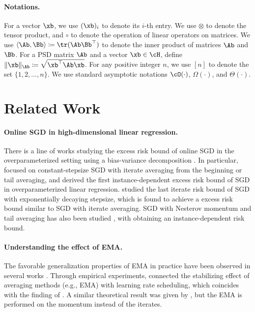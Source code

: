 \documentclass[11pt]{article}
\begin{document}
\paragraph{Notations.}
For a vector $\xb$, we use $(\xb)_i$ to denote its $i$-th entry.
We use $\otimes$ to denote the tensor product, and $\circ$ to denote the operation of linear operators on matrices.
We use $\langle\Ab, \Bb\rangle\coloneqq\tr(\Ab\Bb^\top)$ to denote the inner product of matrices $\Ab$ and $\Bb$.
For a PSD matrix $\Ab$ and a vector $\xb\in\cH$, define $\|\xb\|_{\Ab}\coloneqq\sqrt{\xb^\top\Ab\xb}$.
For any positive integer $n$, we use $[n]$ to denote the set $\{1, 2, \dots, n\}$.
We use standard asymptotic notations $\cO(\cdot)$, $\Omega(\cdot)$, and $\Theta(\cdot)$.

\section{Related Work}

\paragraph{Online SGD in high-dimensional linear regression.}
There is a line of works studying the excess risk bound of online SGD in the overparameterized setting using a bias-variance decomposition \citep{bach2013non, dieuleveut2015non, defossez2015averaged, dieulevuet2017harder, lakshminarayanan2018linear, jain2018parallelizing, berthier2020tight, zou2021benign, wu2022last, lin2024scaling}.
In particular, \citet{zou2021benign} focused on constant-stepsize SGD with iterate averaging from the beginning or tail averaging, and derived the first instance-dependent excess risk bound of SGD in overparameterized linear regression.
\citet{wu2022last} studied the last iterate risk bound of SGD with exponentially decaying stepsize, which is found to achieve a excess risk bound similar to SGD with iterate averaging.
SGD with Nesterov momentum \citep{nesterov2013introductory} and tail averaging has also been studied \citep{jain2018accelerating, varre2022accelerated, li2023risk}, with \citet{li2023risk} obtaining an instance-dependent risk bound.

\paragraph{Understanding the effect of EMA.}
The favorable generalization properties of EMA in practice have been observed in several works \citep{tarvainen2017mean, izmailov2018averaging}.
Through empirical experiments, \citet{sandler2023training} connected the stabilizing effect of averaging methods (e.g., EMA) with learning rate scheduling, which coincides with the finding of \citet{wu2022last}.
A similar theoretical result was given by \citet{defazio2020momentum}, but the EMA is performed on the momentum instead of the iterates.
\end{document}
